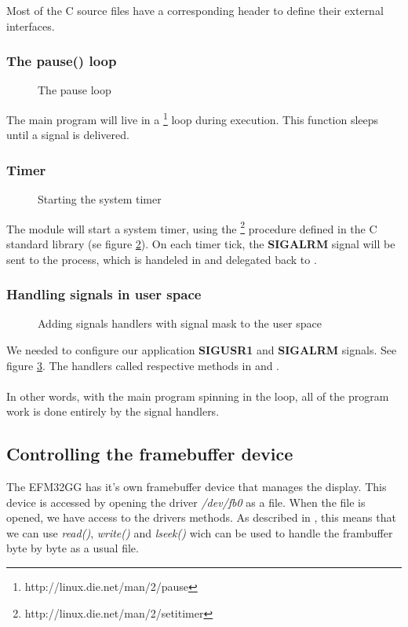 Most of the C source files have a corresponding header to define their external interfaces.

\subsubsection{The pause() loop}
\begin{figure}[h]
	\centering
	
	\caption{The pause loop}
	\label{fig:pause-loop}
\end{figure}
The main program will live in a \footnote{http://linux.die.net/man/2/pause} loop during execution. This function sleeps until a signal is delivered.

\subsubsection{Timer}
\label{subsubsection:timer}
\begin{figure}[h]
	\centering
	
	\caption{Starting the system timer}
	\label{fig:setitimer}
\end{figure}
The  module will start a system timer, using the \footnote{http://linux.die.net/man/2/setitimer} procedure defined in the C standard library (se figure \ref{fig:setitimer}). On each timer tick, the \textbf{SIGALRM} signal will be sent to the process, which is handeled in  and delegated back to .

\subsubsection{Handling signals in user space}
\label{subsubsection:handling-signals}
\begin{figure}[h]
	\centering
	
	\caption{Adding signals handlers with signal mask to the user space}
	\label{fig:sighandler}
\end{figure}
We needed to configure our application \textbf{SIGUSR1} and \textbf{SIGALRM} signals. See figure \ref{fig:sighandler}. The handlers called respective methods in  and .\\
\\
In other words, with the main program spinning in the  loop, all of the program work is done entirely by the signal handlers.


\subsection{Controlling the framebuffer device}
\label{subsection:framebuffer}
The EFM32GG has it's own framebuffer device that manages the display. This device is accessed by opening the driver \emph{/dev/fb0} as a file. When the file is opened, we have access to the drivers methods. As described in \cite[section 5.4.2]{compendium}, this means that we can use \emph{read()}, \emph{write()} and \emph{lseek()} wich can be used to handle the frambuffer byte by byte as a usual file.\\ 

